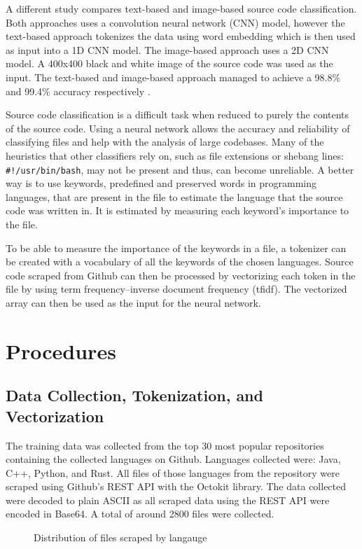 \documentclass[acmlarge]{acmart}
\begin{document}
A different study compares text-based and image-based source code classification. Both approaches
uses a convolution neural network (CNN) model, however the text-based approach tokenizes the data
using word embedding which is then used as input into a 1D CNN model. The image-based approach
uses a 2D CNN model. A 400x400 black and white image of the source code was used as the input.
The text-based and image-based approach managed to achieve a 98.8\% and 99.4\% accuracy respectively
\cite{KiyakBirant2020}.

Source code classification is a difficult task when reduced to purely the contents of the source code.
Using a neural network allows the accuracy and reliability of classifying files and help with the
analysis of large codebases. Many of the heuristics that other classifiers rely on, such as file
extensions or shebang lines: \verb|#!/usr/bin/bash|, may not be present and thus, can become unreliable.
A better way is to use keywords, predefined and preserved words in programming languages, that are 
present in the file to estimate the language that the source code was written in. It is estimated by
measuring each keyword's importance to the file.

To be able to measure the importance of the keywords in a file, a tokenizer can be created with
a vocabulary of all the keywords of the chosen languages. Source code scraped from Github can
then be processed by vectorizing each token in the file by using term frequency–inverse document
frequency (tfidf)\cite{Sparck1972}. The vectorized array can then be used as the input for the
neural network.


\section{Procedures}
\subsection{Data Collection, Tokenization, and Vectorization}
The training data was collected from the top 30 most popular repositories containing the
collected languages on Github. Languages collected were: Java, C++, Python, and Rust. All
files of those languages from the repository were scraped using Github's REST API with the
Octokit library. The data collected were decoded to plain ASCII as all scraped data using
the REST API were encoded in Base64. A total of around 2800 files were collected. 

\begin{figure}[htbp]
  \centering
  
  \caption{Distribution of files scraped by langauge}
\end{figure}
\end{document}
